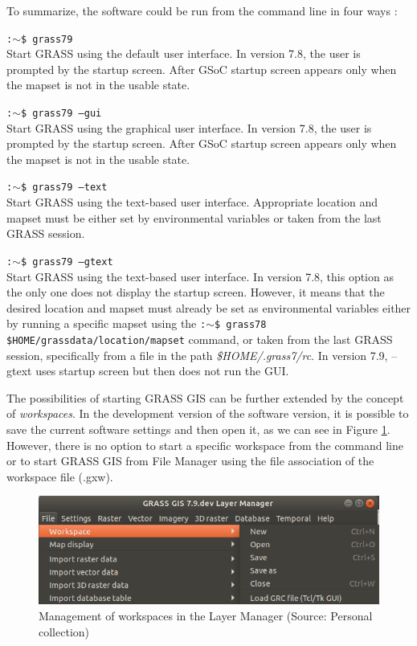 \documentclass[a4paper,10pt,twoside]{article}
\begin{document}
 \noindent To summarize, the software could be run from the command line in four ways \cite{startup}:

\noindent \texttt{:$\sim$\$ grass79} \\
\noindent Start GRASS using the default user interface. In version 7.8, the user is prompted by the startup screen. After GSoC startup screen appears only when the mapset is not in the usable state.

\noindent \texttt{:$\sim$\$ grass79 --gui}\\
\noindent Start GRASS using the graphical user interface.  In version 7.8, the user is prompted by the startup screen. After GSoC startup screen appears only when the mapset is not in the usable state.

\noindent \texttt{:$\sim$\$ grass79 --text} \\
\noindent Start GRASS using the text-based user interface. Appropriate location and mapset must be either set by environmental variables or taken from the last GRASS session.

\noindent \texttt{:$\sim$\$ grass79 --gtext} \\
\noindent Start GRASS using the text-based user interface.  In version 7.8, this option as the only one does not display the startup screen. However, it means that the desired location and mapset must already be set as environmental variables either by running a specific mapset using the \texttt{:$\sim$\$ grass78 \$HOME/grassdata/location/mapset} command, or taken from the last GRASS session, specifically from a file in the path \textit{\$HOME/.grass7/rc}. In version 7.9, --gtext uses startup screen but then does not run the GUI.

The possibilities of starting GRASS GIS can be further extended by the concept of \textit{workspaces}. In the development version of the software version, it is possible to save the current software settings and then open it, as we can see in Figure \ref {fig:workspace_grass}. However, there is no option to start a specific workspace from the command line or to start GRASS GIS from File Manager using the file association of the workspace file (.gxw).

\vspace{0.3cm}
\begin{figure}[hbt!] 
\begin{center}
\includegraphics[width=12cm]{../pictures/workspace_grass.png} 
\caption[Management of workspaces in the Layer Manager]{Management of workspaces in the Layer Manager (Source: Personal collection)}
\label{fig:workspace_grass}
\end{center}
\end{figure}
\end{document}
